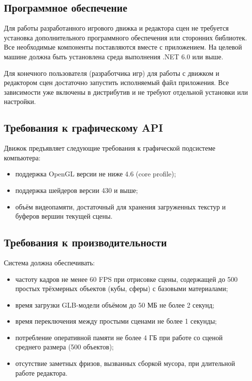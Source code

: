 \subsection{Программное обеспечение}
Для работы разработанного игрового движка и редактора сцен не требуется установка дополнительного программного обеспечения или сторонних библиотек. Все необходимые компоненты поставляются вместе с приложением. На целевой машине должна быть установлена среда выполнения .NET 6.0 или выше.

Для конечного пользователя (разработчика игр) для работы с движком и редактором сцен достаточно запустить исполняемый файл приложения. Все зависимости уже включены в дистрибутив и не требуют отдельной установки или настройки.

\subsection{Требования к графическому API}
Движок предъявляет следующие требования к графической подсистеме компьютера:
\begin{itemize}
	\item поддержка OpenGL версии не ниже 4.6 (core profile);
	\item поддержка шейдеров версии 430 и выше;
	\item объём видеопамяти, достаточный для хранения загруженных текстур и буферов вершин текущей сцены.
\end{itemize}

\subsection{Требования к производительности}
Система должна обеспечивать:
\begin{itemize}
	\item частоту кадров не менее 60 FPS при отрисовке сцены, содержащей до 500 простых трёхмерных объектов (кубы, сферы) с базовыми материалами;
	
	\item время загрузки GLB-модели объёмом до 50 МБ не более 2 секунд;
	
	\item время переключения между простыми сценами не более 1 секунды;
	
	\item потребление оперативной памяти не более 4 ГБ при работе со сценой среднего размера (500 объектов);
	
	\item отсутствие заметных фризов, вызванных сборкой мусора, при длительной работе редактора.
\end{itemize}

